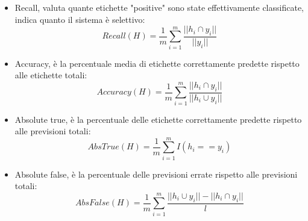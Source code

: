 \begin{itemize}
	\item Recall, valuta quante etichette "positive" sono state effettivamente classificate, indica quanto il sistema è selettivo:
	\begin{equation}
		Recall(H) = \frac{1}{m}\sum_{i=1}^{m}\frac{||h_{i}\cap y_{i}||}{||y_{i}||}
	\end{equation}
	
	\item Accuracy, è la percentuale media di etichette correttamente predette rispetto alle etichette totali:
	\begin{equation}
		Accuracy(H) = \frac{1}{m}\sum_{i=1}^{m}\frac{||h_{i}\cap y_{i}||}{||h_{i}\cup y_{i}||}
	\end{equation}
	
	\item Absolute true, è la percentuale delle etichette correttamente predette rispetto alle previsioni totali:
	\begin{equation}
		AbsTrue(H) = \frac{1}{m}\sum_{i=1}^{m}I(h_{i} == y_{i})
	\end{equation}
	
	\item Absolute false, è la percentuale delle previsioni errate rispetto alle previsioni totali:
	\begin{equation}
		AbsFalse(H) = \frac{1}{m}\sum_{i=1}^{m}\frac{||h_{i}\cup y_{i}||-||h_{i}\cap y_{i}||}{l}
	\end{equation}
	
\end{itemize}


